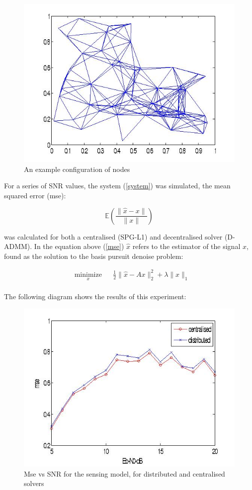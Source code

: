 \begin{figure}
\centering
\includegraphics[height = 7 cm]{examplegraph.jpg}
\caption{An example configuration of nodes}
\label{exgraph}
\end{figure}

For a series of SNR values, the system (\ref{system}) was simulated, the mean squared error (mse):

\begin{equation}
\mathbb{E}\left( \frac{\| \hat{x}-x \|}{\| x \|} \right)
\label{mse}
\end{equation}

was calculated for both a centralised (SPG-L1) and decentralised solver (D-ADMM). In the equation above (\ref{mse}) \(\hat{x}\) refers to the estimator of the signal \(x\), found as the solution to the basis pursuit denoise problem:

\begin{equation*}
\begin{aligned}
& \underset{x}{\text{minimize}}
& & \frac{1}{2}\|\hat{x} - Ax\|_2^2 + \lambda\|x\|_1 \\
& 
\label{bpdn}
\end{aligned}
\end{equation*}

The following diagram shows the results of this experiment: 

\begin{figure}
\centering
\includegraphics[height = 7 cm]{msevssnr.jpg}
\caption{Mse vs SNR for the sensing model, for distributed and centralised solvers}
\label{msevssnr1}
\end{figure}

